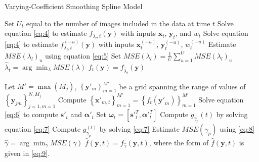\documentclass[11pt,reqno]{article}
\theoremstyle{definition}
\begin{document}

\LinesNumbered

\begin{algorithm}
\caption{Varying-Coefficient Smoothing Spline Model}\label{alg:varying_spline}

 {
  Set $U_t$ equal to the number of images included in the data at time $t$\;
   {
    Solve equation \ref{eq:4} to estimate $f_{\lambda_l, t}(\mathbf{y})$ with inputs $\mathbf{x}_t$, $\mathbf{y}_t$, and $w_t$\;
     {
      Solve equation \ref{eq:4} to estimate $f^{(-u)}_{\lambda_l, t}(\mathbf{y})$ with inputs $\mathbf{x}^{(-u)}_t$, $\mathbf{y}^{(-u)}_t$, $w^{(-u)}_t$\;
      Estimate $MSE(\lambda_{l})_u$ using equation \ref{eq:5}\;
    }
    Set $MSE(\lambda_l) = \frac{1}{U}\sum_{u=1}^{U}MSE(\lambda_l)_u$\;
  }
  $\hat{\lambda}_t = \arg \min_{\lambda} MSE(\lambda)$\;
  $f_t(\mathbf{y}) = f_{\hat{\lambda}_t}(\mathbf{y})$\;
}

  Let $M' = \max(M_{j})$, $\left\{\mathbf{y}'_{m}\right\}_{m=1}^{M'}$ be a grid spanning the range of values of $\left\{\mathbf{y}_{jm}\right\}_{j=1, m=1}^{N, M_j}$\;
   {
    Compute $\left\{\mathbf{x'}_{m, t}\right\}_{m=1}^{M'} = \left\{f_t(\mathbf{y'}_m)\right\}_{m=1}^{M'}$\;
    Solve equation \ref{eq:6} to compute $\mathbf{s'}_t$ and $\mathbf{\alpha'}_t$\;
    Set $\mathbf{\omega}_t = \left[\mathbf{s'}_t^{T}, \mathbf{\alpha'}_t^{T}\right]$\;
  }
   {
    Compute $g_{\gamma_p}(t)$ by solving equation \ref{eq:7}\;
     {
      Compute $g_{\gamma_p}^{(t)}$ by solving \ref{eq:7}\;
    }
    Estimate $MSE(\gamma_p)$ using \ref{eq:8}\;
  }
  $\hat{\gamma} = \arg \min_{\gamma} MSE(\gamma)$\;
  $\hat{f}(\mathbf{y}, t) = f_{\hat{\gamma}}(\mathbf{y}, t)$, where the form of $\hat{f}(\mathbf{y}, t)$ is given in \ref{eq:9}.
\end{algorithm}
\end{document}
